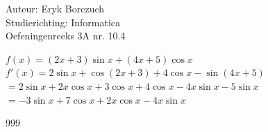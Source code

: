 \documentclass[a4paper]{article}
\begin{document}
  
\noindent \large Auteur: Eryk Borczuch \\
\noindent \large Studierichting: Informatica\\
\noindent \large Oefeningenreeks 3A nr. 10.4\\

\medskip

\normalsize

$f(x) = (2x+3) \sin x + (4x+5) \cos x$\\

$f'(x) = 2\sin x + \cos (2x+3) +4 \cos x - \sin (4x+5)$\\

$= 2 \sin x +2x \cos x + 3 \cos x + 4\cos x -4x \sin x - 5\sin x$\\

$= -3 \sin x + 7 \cos x +2x \cos x -4x \sin x$\\

\begin{thebibliography}{999}
\end{thebibliography}
\end{document}
